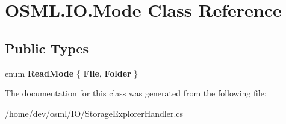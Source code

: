 \hypertarget{classOSML_1_1IO_1_1Mode}{}\section{O\+S\+M\+L.\+I\+O.\+Mode Class Reference}
\label{classOSML_1_1IO_1_1Mode}
\subsection*{Public Types}
\begin{DoxyCompactItemize}
\item 
\mbox{\label{classOSML_1_1IO_1_1Mode_a057e4a7b31673bc0c7d34bda3426f0d4}} 
enum {\bfseries Read\+Mode} \{ {\bfseries File}, 
{\bfseries Folder}
 \}
\end{DoxyCompactItemize}


The documentation for this class was generated from the following file\+:\begin{DoxyCompactItemize}
\item 
/home/dev/osml/\+I\+O/Storage\+Explorer\+Handler.\+cs\end{DoxyCompactItemize}
